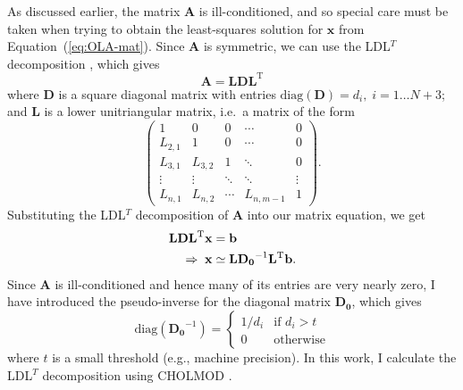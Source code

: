 As discussed earlier, the matrix $\mathbf{A}$ is ill-conditioned, and so special care must be taken when trying to obtain the least-squares solution for $\mathbf{x}$ from Equation~(\ref{eq:OLA-mat}). 
Since $\mathbf{A}$ is symmetric, we can use the LDL$^T$ decomposition \citep[e.g.,][]{banerjee2014linear}, which gives 
\begin{equation}
    \mathbf{A} = \mathbf{LDL}^{\text{T}}
\end{equation}
where $\mathbf{D}$ is a square diagonal matrix with entries ${\text{diag}(\mathbf{D}) = d_i},\; {i=1\ldots N+3}$; and $\mathbf{L}$ is a lower unitriangular matrix, i.e.\ a matrix of the form %
\begin{equation} \label{eq:lower-diag}
    \begin{pmatrix}
        1       &   0     & 0      & \cdots & 0 \\[3mm]
        L_{2,1} &   1     & 0      & \cdots & 0 \\[3mm]
        L_{3,1} & L_{3,2} & 1      & \ddots & 0 \\[3mm]
        \vdots  & \vdots  & \ddots & \ddots & \vdots \\[3mm]
        L_{n,1} & L_{n,2} & \cdots & L_{n,m-1} & 1
    \end{pmatrix}.
\end{equation}
Substituting the LDL$^T$ decomposition of $\mathbf A$ into our matrix equation, we get
\begin{align}
    \mathbf{LDL}^{\text{T}} \mathbf{x} &= \mathbf{b} \notag\\
    \Rightarrow\; \mathbf{x} &\simeq \mathbf{LD_0}^{-1}\mathbf{L}^{\text{T}}\mathbf{b}.
\end{align}
Since $\mathbf{A}$ is ill-conditioned and hence many of its entries are very nearly zero, I have introduced the pseudo-inverse for the diagonal matrix $\mathbf{D_0}$, which gives 
\begin{equation}
    \text{diag}(\mathbf{D_0}^{-1})
    =
    \begin{cases}
        1/d_i & \text{if } d_i > t \\
        0 & \text{otherwise}
    \end{cases}
\end{equation}
where $t$ is a small threshold (e.g., machine precision). 
In this work, I calculate the LDL$^T$ decomposition using {\textsc CHOLMOD} \citep{Chen2008Algorithm8C}. 

